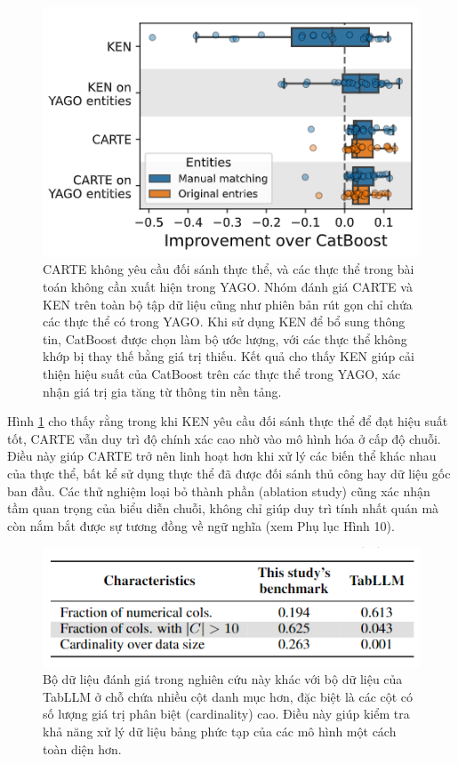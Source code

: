 \documentclass{article}
\begin{document}
\begin{figure} 
    \centering
    \includegraphics[scale = 0.8]{carte_entity_matching_not_required.png}
    \caption{CARTE không yêu cầu đối sánh thực thể, và các thực thể trong bài toán không cần xuất hiện trong YAGO. Nhóm đánh giá CARTE và KEN trên toàn bộ tập dữ liệu cũng như phiên bản rút gọn chỉ chứa các thực thể có trong YAGO. Khi sử dụng KEN để bổ sung thông tin, CatBoost được chọn làm bộ ước lượng, với các thực thể không khớp bị thay thế bằng giá trị thiếu. Kết quả cho thấy KEN giúp cải thiện hiệu suất của CatBoost trên các thực thể trong YAGO, xác nhận giá trị gia tăng từ thông tin nền tảng.}
    \label{fig:carte_entity_matching_not_required}
\end{figure}

Hình \ref{fig:carte_entity_matching_not_required} cho thấy rằng trong khi KEN yêu cầu đối sánh thực thể để đạt hiệu suất tốt, CARTE vẫn duy trì độ chính xác cao nhờ vào mô hình hóa ở cấp độ chuỗi. Điều này giúp CARTE trở nên linh hoạt hơn khi xử lý các biến thể khác nhau của thực thể, bất kể sử dụng thực thể đã được đối sánh thủ công hay dữ liệu gốc ban đầu. Các thử nghiệm loại bỏ thành phần (ablation study) cũng xác nhận tầm quan trọng của biểu diễn chuỗi, không chỉ giúp duy trì tính nhất quán mà còn nắm bắt được sự tương đồng về ngữ nghĩa (xem Phụ lục Hình 10).

\begin{figure} 
    \centering
    \includegraphics[scale = 0.8]{carte_vs_tabllm_dataset.png}
    \caption{Bộ dữ liệu đánh giá trong nghiên cứu này khác với bộ dữ liệu của TabLLM ở chỗ chứa nhiều cột danh mục hơn, đặc biệt là các cột có số lượng giá trị phân biệt (cardinality) cao. Điều này giúp kiểm tra khả năng xử lý dữ liệu bảng phức tạp của các mô hình một cách toàn diện hơn.}
    \label{fig:carte_vs_tabllm_dataset}
\end{figure}
\end{document}
